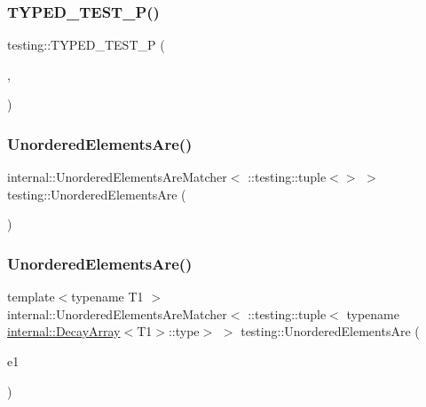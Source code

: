 \mbox{\label{namespacetesting_a3f3fbbc7ecc23117307b81deb8f4cfac}} 
\subsubsection{\texorpdfstring{TYPED\_TEST\_P()}{TYPED\_TEST\_P()}}
{\footnotesize\ttfamily testing\+::\+T\+Y\+P\+E\+D\+\_\+\+T\+E\+S\+T\+\_\+P (\begin{DoxyParamCaption}\item[{\mbox{\hyperlink{classtesting_1_1CodeLocationForTYPEDTESTP}{Code\+Location\+For\+T\+Y\+P\+E\+D\+T\+E\+S\+TP}}}]{,  }\item[{Verify}]{ }\end{DoxyParamCaption})}

\mbox{\label{namespacetesting_a8622c12aadfa0e60f7d68683eeb21115}} 
\subsubsection{\texorpdfstring{UnorderedElementsAre()}{UnorderedElementsAre()}\hspace{0.1cm}{\footnotesize\ttfamily [1/11]}}
{\footnotesize\ttfamily internal\+::\+Unordered\+Elements\+Are\+Matcher$<$ \+::testing\+::tuple$<$$>$ $>$ testing\+::\+Unordered\+Elements\+Are (\begin{DoxyParamCaption}{ }\end{DoxyParamCaption})\hspace{0.3cm}{\ttfamily [inline]}}

\mbox{\label{namespacetesting_a0b81dd5584a3588cc2516b29ef166b7d}} 
\subsubsection{\texorpdfstring{UnorderedElementsAre()}{UnorderedElementsAre()}\hspace{0.1cm}{\footnotesize\ttfamily [2/11]}}
{\footnotesize\ttfamily template$<$typename T1 $>$ \\
internal\+::\+Unordered\+Elements\+Are\+Matcher$<$ \+::testing\+::tuple$<$ typename \mbox{\hyperlink{structtesting_1_1internal_1_1DecayArray}{internal\+::\+Decay\+Array}}$<$T1$>$\+::type$>$ $>$ testing\+::\+Unordered\+Elements\+Are (\begin{DoxyParamCaption}\item[{const T1 \&}]{e1 }\end{DoxyParamCaption})\hspace{0.3cm}{\ttfamily [inline]}}

